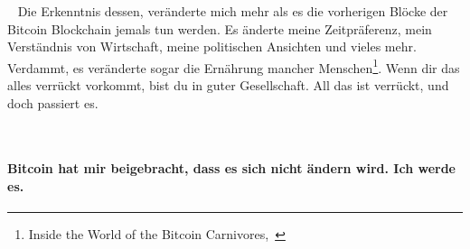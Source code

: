 ~
Die Erkenntnis dessen, veränderte mich mehr als es die vorherigen Blöcke der
Bitcoin Blockchain jemals tun werden. Es änderte meine Zeitpräferenz, mein
Verständnis von Wirtschaft, meine politischen Ansichten und vieles mehr.
Verdammt, es veränderte sogar die Ernährung mancher Menschen\footnote{Inside the
World of the Bitcoin Carnivores,~\cite{carnivores}}. Wenn dir das alles verrückt
vorkommt, bist du in guter Gesellschaft. All das ist verrückt, und doch passiert
es.

~

\paragraph{Bitcoin hat mir beigebracht, dass es sich nicht ändern wird. Ich werde es.}

%
%
%
%
%
%
%
%
%
